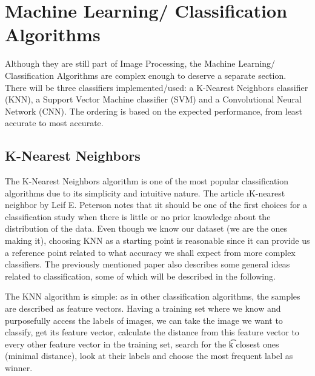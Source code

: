 
\section{Machine Learning/ Classification Algorithms} \label{sec:machine-learning--classification-algorithms}

Although they are still part of Image Processing, the Machine Learning/ Classification Algorithms are complex enough to deserve a separate section. There will be three classifiers implemented/used: a K-Nearest Neighbors classifier (KNN), a Support Vector Machine classifier (SVM) and a Convolutional Neural Network (CNN). The ordering is based on the expected performance, from least accurate to most accurate.



\subsection{K-Nearest Neighbors}

The K-Nearest Neighbors algorithm is one of the most popular classification algorithms due to its simplicity and intuitive nature. The article \i{K-nearest neighbor by Leif E. Peterson}\cite{knn} notes that \i{it should be one of the first choices for a classification study when there is little or no prior knowledge about the distribution of the data}. Even though we know our dataset (we are the ones making it), choosing KNN as a starting point is reasonable since it can provide us a reference point related to what accuracy we shall expect from more complex classifiers. The previously mentioned paper also describes some general ideas related to classification, some of which will be described in the following.

The KNN algorithm is simple: as in other classification algorithms, the samples are described as feature vectors. Having a training set where we know and purposefully access the labels of images, we can take the image we want to classify, get its feature vector, calculate the distance from this feature vector to every other feature vector in the training set, search for the \t{k} closest ones (minimal distance), look at their labels and choose the most frequent label as winner.

